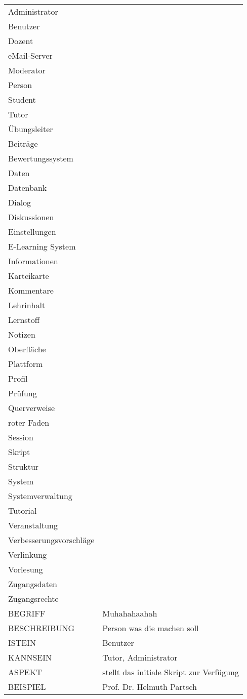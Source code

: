 \documentclass[12pt,a4paper]{article}
\begin{document}
\begin{tabular}{l p{10cm}}
\\

Administrator\\
Benutzer\\
Dozent\\
eMail-Server\\
Moderator\\
Person\\
Student\\
Tutor\\
Übungsleiter\\

Beiträge\\
Bewertungssystem\\
Daten\\
Datenbank\\
Dialog\\
Diskussionen\\
Einstellungen\\
E-Learning System\\
Informationen\\
Karteikarte\\
Kommentare\\
Lehrinhalt\\
Lernstoff\\
Notizen\\
Oberfläche\\
Plattform\\
Profil\\
Prüfung\\
Querverweise\\
roter Faden\\
Session\\
Skript\\
Struktur\\
System\\
Systemverwaltung\\
Tutorial\\
Veranstaltung\\
Verbesserungsvorschläge\\
Verlinkung\\
Vorlesung\\
Zugangsdaten\\
Zugangsrechte\\


BEGRIFF 	 & Muhahahaahah \\ 
BESCHREIBUNG & Person was die machen soll \\ 
ISTEIN   	 & Benutzer\\
KANNSEIN 	 & Tutor, Administrator \\ 
ASPEKT   	 & stellt das initiale Skript zur Verfügung\\
BEISPIEL 	 & Prof. Dr. Helmuth Partsch\\
\hline

\end{tabular}
\end{document}
